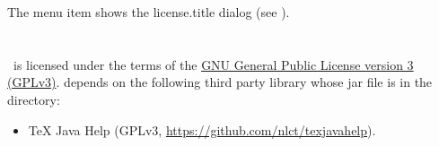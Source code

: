 
The  menu item shows the
\InlineMsgDef
 {license.title}
dialog (see ).




\chapter{}
\label{sec:licence}

%
\JDRView\ is licensed under the terms of the 
\href{https://www.gnu.org/licenses/gpl-3.0.html}{GNU General
Public License version 3 (GPLv3)}.
 depends on the following third party library whose jar
file is in the  directory:
\begin{itemize}
   \item TeX Java Help 
   (GPLv3, \url{https://github.com/nlct/texjavahelp}).
\end{itemize}



\printmain
\printindex 

 

